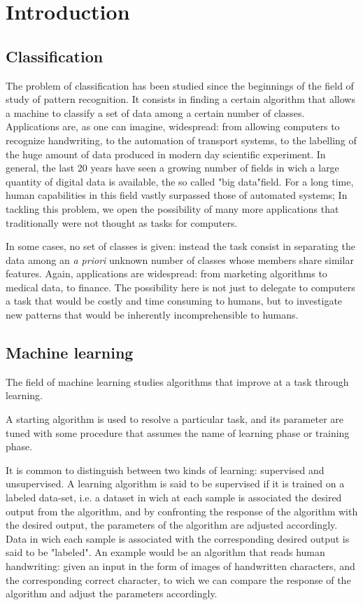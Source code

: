 \documentclass[a4paper]{report}
\begin{document}
\listoftodos

\chapter{Introduction}
\section{Classification}
The problem of classification has been studied since the beginnings of the field of study of pattern recognition. It consists in finding a certain algorithm that allows a machine to classify a set of data among a certain number of classes. Applications are, as one can imagine, widespread: from allowing computers to recognize handwriting, to the automation of transport systems, to the labelling of the huge amount of data produced in modern day scientific experiment. In general, the last 20 years have seen a growing number of fields in wich a large quantity of digital data is available, the so called "big data"field. For a long time, human capabilities in this field vastly surpassed those of automated systems; In tackling this problem, we open the possibility of many more applications that traditionally were not thought as  tasks for computers.

In some cases, no set of classes is given: instead the task consist in separating the data among an \textit{a priori} unknown number of classes whose members share similar features. Again, applications are widespread: from marketing algorithms to medical data, to finance. The possibility here is not just to delegate to computers a task that would be costly and time consuming to humans, but to investigate new patterns that would be inherently incomprehensible to humans.


\section{Machine learning}
The field of machine learning studies algorithms that improve at a task through learning.

A starting algorithm is used to resolve a particular task, and its parameter are tuned with some procedure that assumes the name of learning phase or training phase.

It is common to distinguish between two kinds of learning: supervised and unsupervised. A learning algorithm is said to be supervised if it is trained on a labeled data-set, i.e. a dataset in wich at each sample is associated the desired output from the algorithm, and by confronting the response of the algorithm with the desired output, the parameters of the algorithm are adjusted accordingly. Data in wich each sample is associated with the corresponding desired output is said to be "labeled".  An example would be an algorithm that reads human handwriting: given an input in the form of images of handwritten characters, and the corresponding correct character, to wich we can compare the response of the algorithm and adjust the parameters accordingly.
\end{document}
